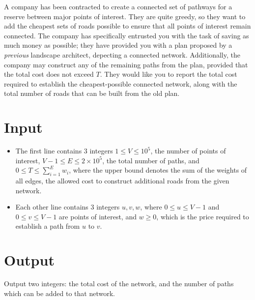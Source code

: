 A company has been contracted to create a connected set of pathways for a reserve between major points of interest. They are quite greedy, so they want to add the cheapest sets of roads possible to ensure that all points of interest remain connected. The company has specifically entrusted you with the task of saving as much money as possible; they have provided you with a plan proposed by a \textit{previous} landscape architect, depecting a connected network. Additionally, the company may construct any of the remaining paths from the plan, provided that the total cost does not exceed $T$. They would like you to report the total cost required to establish the cheapest-possible connected network, along with the total number of roads that can be built from the old plan.

\section*{Input}
\begin{itemize}
    \item The first line contains 3 integers $1 \leq V \leq 10^5$, the number of points of interest, $V-1 \leq E \leq 2 \times 10^5$, the total number of paths, and $0 \leq T \leq \sum_{i=1}^{E} w_{i}$, where the upper bound denotes the sum of the weights of all edges, the allowed cost to construct additional roads from the given network.
    \item Each other line contains 3 integers $u, v, w$, where $0 \leq u \leq V - 1$ and $0 \leq v \leq V - 1$ are points of interest, and $w \geq 0$, which is the price required to establish a path from $u$ to $v$.
\end{itemize}

\section*{Output}
Output two integers: the total cost of the network, and the number of paths which can be added to that network.